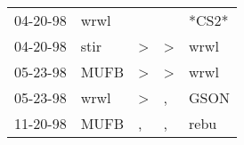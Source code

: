 \begin{supertabular}{p{0.07\textwidth}p{0.06\textwidth}p{0.02\textwidth}p{0.02\textwidth}p{0.06\textwidth}}
 04-20-98\textsuperscript{} &  wrwl\textsuperscript{} &               &               &                   *CS2* \\
 04-20-98\textsuperscript{} &  stir\textsuperscript{} &  \textgreater &  \textgreater &  wrwl\textsuperscript{} \\
 05-23-98\textsuperscript{} &  MUFB\textsuperscript{} &  \textgreater &  \textgreater &  wrwl\textsuperscript{} \\
 05-23-98\textsuperscript{} &  wrwl\textsuperscript{} &  \textgreater &             , &  GSON\textsuperscript{} \\
 11-20-98\textsuperscript{} &  MUFB\textsuperscript{} &             , &             , &  rebu\textsuperscript{} \\
\end{supertabular}
